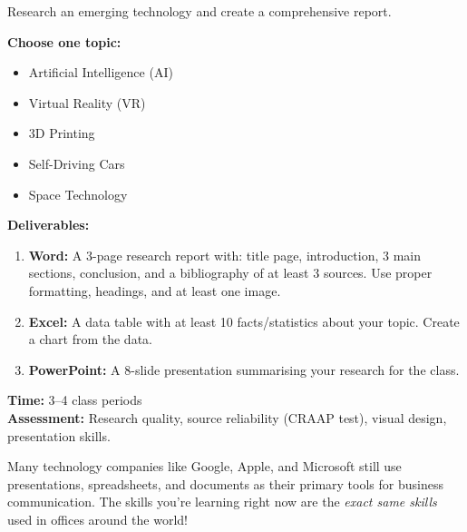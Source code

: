 \begin{labstep}
Research an emerging technology and create a comprehensive report.

\textbf{Choose one topic:}
\begin{itemize}[leftmargin=*, label={\textcolor{ModuleBlue}{\faAngleRight}}, itemsep=2pt]
  \item Artificial Intelligence (AI)
  \item Virtual Reality (VR)
  \item 3D Printing
  \item Self-Driving Cars
  \item Space Technology
\end{itemize}

\textbf{Deliverables:}
\begin{enumerate}[label=\textcolor{ModuleBlue}{\textbf{\arabic*.}}, itemsep=3pt]
  \item \textbf{Word:} A 3-page research report with: title page, introduction, 3 main sections, conclusion, and a bibliography of at least 3 sources. Use proper formatting, headings, and at least one image.
  \item \textbf{Excel:} A data table with at least 10 facts/statistics about your topic. Create a chart from the data.
  \item \textbf{PowerPoint:} A 8-slide presentation summarising your research for the class.
\end{enumerate}

\textbf{Time:} 3--4 class periods\\
\textbf{Assessment:} Research quality, source reliability (CRAAP test), visual design, presentation skills.
\end{labstep}


\begin{funfact}
Many technology companies like Google, Apple, and Microsoft still use presentations, spreadsheets, and documents as their primary tools for business communication. The skills you're learning right now are the \emph{exact same skills} used in offices around the world!
\end{funfact}
